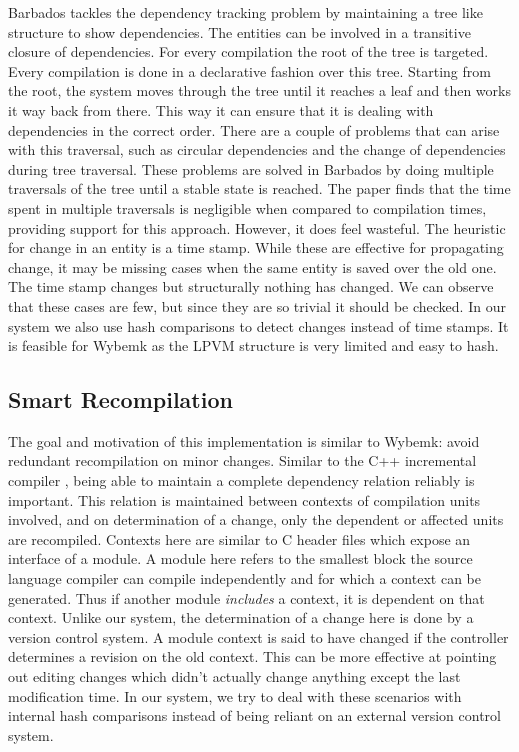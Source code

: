 Barbados tackles the dependency tracking problem by maintaining a tree like
structure to show dependencies. The entities can be involved in a transitive
closure of dependencies. For every compilation the root of the tree is
targeted. Every compilation is done in a declarative fashion over this
tree. Starting from the root, the system moves through the tree until it
reaches a leaf and then works it way back from there. This way it can ensure
that it is dealing with dependencies in the correct order. There are a couple
of problems that can arise with this traversal, such as circular dependencies
and the change of dependencies during tree traversal. These problems are solved
in Barbados by doing multiple traversals of the tree until a stable state is
reached. The paper finds that the time spent in multiple traversals is
negligible when compared to compilation times, providing support for this
approach. However, it does feel wasteful. The heuristic for change in an entity
is a time stamp. While these are effective for propagating change, it may be
missing cases when the same entity is saved over the old one. The time stamp
changes but structurally nothing has changed. We can observe that these cases
are few, but since they are so trivial it should be checked. In our system we
also use hash comparisons to detect changes instead of time stamps. It is
feasible for Wybemk as the LPVM structure is very limited and easy to hash.

\subsection{Smart Recompilation}
\label{sssec:smart_recompilation}

The goal and motivation of this implementation is similar to Wybemk: avoid
redundant recompilation on minor changes. Similar to the C++ incremental
compiler \citep{cpp_compiler}, being able to maintain a complete dependency
relation reliably is important. This relation is maintained between contexts of
compilation units involved, and on determination of a change, only the
dependent or affected units are recompiled. Contexts here are similar to C
header files which expose an interface of a module. A module here refers to the
smallest block the source language compiler can compile independently and for
which a context can be generated. Thus if another module \textit{includes} a
context, it is dependent on that context. Unlike our system, the determination
of a change here is done by a version control system. A module context is said
to have changed if the controller determines a revision on the old
context. This can be more effective at pointing out editing changes which
didn't actually change anything except the last modification time. In our
system, we try to deal with these scenarios with internal hash comparisons
instead of being reliant on an external version control system.

